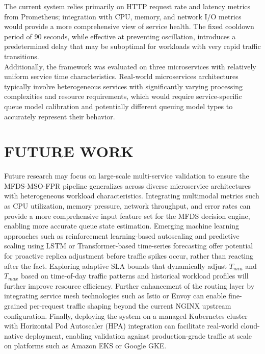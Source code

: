 The current system relies primarily on HTTP request rate and latency metrics from Prometheus; integration with CPU, memory, and network I/O metrics would provide a more comprehensive view of service health. The fixed cooldown period of 90 seconds, while effective at preventing oscillation, introduces a predetermined delay that may be suboptimal for workloads with very rapid traffic transitions.\\

Additionally, the framework was evaluated on three microservices with relatively uniform service time characteristics. Real-world microservices architectures typically involve heterogeneous services with significantly varying processing complexities and resource requirements, which would require service-specific queue model calibration and potentially different queuing model types to accurately represent their behavior.

\section{\uppercase{Future Work}}

Future research may focus on large-scale multi-service validation 
to ensure the MFDS-MSO-FPR pipeline generalizes across diverse 
microservice architectures with heterogeneous workload 
characteristics. Integrating multimodal metrics such as CPU 
utilization, memory pressure, network throughput, and error 
rates can provide a more comprehensive input feature set for 
the MFDS decision engine, enabling more accurate queue state 
estimation. Emerging machine learning approaches such as 
reinforcement learning-based autoscaling and predictive scaling 
using LSTM or Transformer-based time-series forecasting offer 
potential for proactive replica adjustment before traffic spikes 
occur, rather than reacting after the fact. Exploring adaptive 
SLA bounds that dynamically adjust $T_{min}$ and $T_{max}$ 
based on time-of-day traffic patterns and historical workload 
profiles will further improve resource efficiency. Further 
enhancement of the routing layer by integrating service mesh 
technologies such as Istio or Envoy can enable fine-grained 
per-request traffic shaping beyond the current NGINX upstream 
configuration. Finally, deploying the system on a managed 
Kubernetes cluster with Horizontal Pod Autoscaler (HPA) 
integration can facilitate real-world cloud-native deployment, 
enabling validation against production-grade traffic at scale 
on platforms such as Amazon EKS or Google GKE.\\


